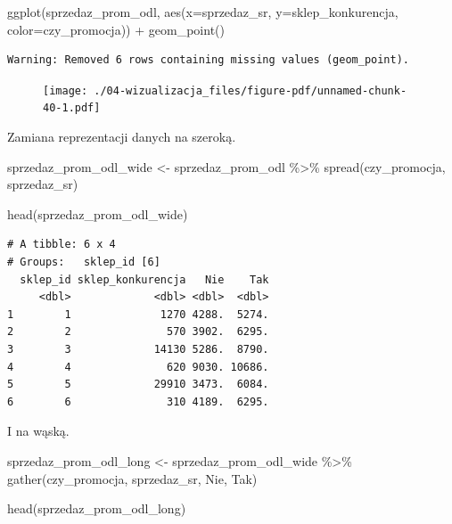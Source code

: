 \documentclass[
  letterpaper,
  DIV=11,
  numbers=noendperiod]{scrreprt}
\newenvironment{Shaded}{\begin{snugshade}}{\end{snugshade}}
\newcommand{\AttributeTok}[1]{\textcolor[rgb]{0.40,0.45,0.13}{#1}}
\newcommand{\FunctionTok}[1]{\textcolor[rgb]{0.28,0.35,0.67}{#1}}
\newcommand{\NormalTok}[1]{\textcolor[rgb]{0.00,0.23,0.31}{#1}}
\newcommand{\OtherTok}[1]{\textcolor[rgb]{0.00,0.23,0.31}{#1}}
\newcommand{\SpecialCharTok}[1]{\textcolor[rgb]{0.37,0.37,0.37}{#1}}
\begin{document}
\begin{Shaded}
\begin{Highlighting}[]
\FunctionTok{ggplot}\NormalTok{(sprzedaz\_prom\_odl, }\FunctionTok{aes}\NormalTok{(}\AttributeTok{x=}\NormalTok{sprzedaz\_sr, }\AttributeTok{y=}\NormalTok{sklep\_konkurencja, }\AttributeTok{color=}\NormalTok{czy\_promocja)) }\SpecialCharTok{+} 
  \FunctionTok{geom\_point}\NormalTok{()}
\end{Highlighting}
\end{Shaded}

\begin{verbatim}
Warning: Removed 6 rows containing missing values (geom_point).
\end{verbatim}

\begin{figure}[H]

{\centering \texttt{[image: ./04-wizualizacja\_files/figure-pdf/unnamed-chunk-40-1.pdf]}

}

\end{figure}

Zamiana reprezentacji danych na szeroką.

\begin{Shaded}
\begin{Highlighting}[]
\NormalTok{sprzedaz\_prom\_odl\_wide }\OtherTok{\textless{}{-}}\NormalTok{ sprzedaz\_prom\_odl }\SpecialCharTok{\%\textgreater{}\%}
  \FunctionTok{spread}\NormalTok{(czy\_promocja, sprzedaz\_sr)}

\FunctionTok{head}\NormalTok{(sprzedaz\_prom\_odl\_wide)}
\end{Highlighting}
\end{Shaded}

\begin{verbatim}
# A tibble: 6 x 4
# Groups:   sklep_id [6]
  sklep_id sklep_konkurencja   Nie    Tak
     <dbl>             <dbl> <dbl>  <dbl>
1        1              1270 4288.  5274.
2        2               570 3902.  6295.
3        3             14130 5286.  8790.
4        4               620 9030. 10686.
5        5             29910 3473.  6084.
6        6               310 4189.  6295.
\end{verbatim}

I na wąską.

\begin{Shaded}
\begin{Highlighting}[]
\NormalTok{sprzedaz\_prom\_odl\_long }\OtherTok{\textless{}{-}}\NormalTok{ sprzedaz\_prom\_odl\_wide }\SpecialCharTok{\%\textgreater{}\%}
  \FunctionTok{gather}\NormalTok{(czy\_promocja, sprzedaz\_sr, Nie, Tak)}

\FunctionTok{head}\NormalTok{(sprzedaz\_prom\_odl\_long)}
\end{Highlighting}
\end{Shaded}
\end{document}
